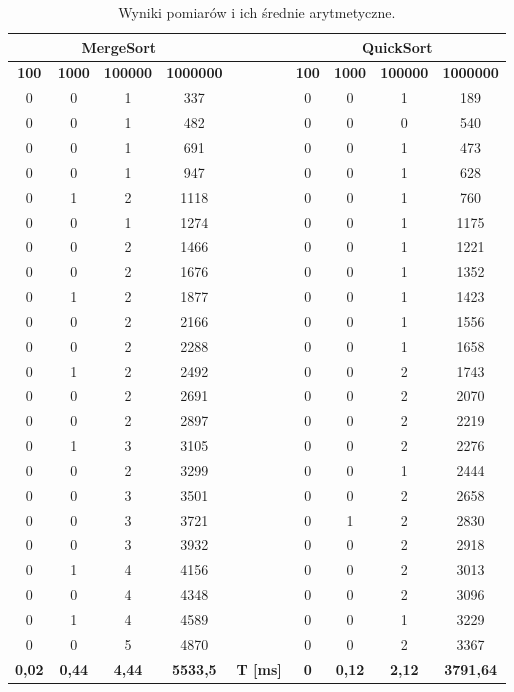 \documentclass[11pt,a4paper]{article}
\begin{document}
\begin{table}[htbp]
\caption{Wyniki pomiarów i ich średnie arytmetyczne.}
\begin{center}
\begin{tabular}{|c|c|c|c|c|c|c|c|c|}
\hline
\multicolumn{ 4}{|c|}{\textbf{MergeSort}} & \textbf{} & \multicolumn{ 4}{c|}{\textbf{QuickSort}} \\ \hline
\textbf{100} & \textbf{1000} & \textbf{100000} & \textbf{1000000} & \textbf{} & \textbf{100} & \textbf{1000} & \textbf{100000} & \textbf{1000000} \\ \hline
0 & 0 & 1 & 337 &  & 0 & 0 & 1 & 189 \\ \hline
0 & 0 & 1 & 482 &  & 0 & 0 & 0 & 540 \\ \hline
0 & 0 & 1 & 691 &  & 0 & 0 & 1 & 473 \\ \hline
0 & 0 & 1 & 947 &  & 0 & 0 & 1 & 628 \\ \hline
0 & 1 & 2 & 1118 &  & 0 & 0 & 1 & 760 \\ \hline
0 & 0 & 1 & 1274 &  & 0 & 0 & 1 & 1175 \\ \hline
0 & 0 & 2 & 1466 &  & 0 & 0 & 1 & 1221 \\ \hline
0 & 0 & 2 & 1676 &  & 0 & 0 & 1 & 1352 \\ \hline
0 & 1 & 2 & 1877 &  & 0 & 0 & 1 & 1423 \\ \hline
0 & 0 & 2 & 2166 &  & 0 & 0 & 1 & 1556 \\ \hline
0 & 0 & 2 & 2288 &  & 0 & 0 & 1 & 1658 \\ \hline
0 & 1 & 2 & 2492 &  & 0 & 0 & 2 & 1743 \\ \hline
0 & 0 & 2 & 2691 &  & 0 & 0 & 2 & 2070 \\ \hline
0 & 0 & 2 & 2897 &  & 0 & 0 & 2 & 2219 \\ \hline
0 & 1 & 3 & 3105 &  & 0 & 0 & 2 & 2276 \\ \hline
0 & 0 & 2 & 3299 &  & 0 & 0 & 1 & 2444 \\ \hline
0 & 0 & 3 & 3501 &  & 0 & 0 & 2 & 2658 \\ \hline
0 & 0 & 3 & 3721 &  & 0 & 1 & 2 & 2830 \\ \hline
0 & 0 & 3 & 3932 &  & 0 & 0 & 2 & 2918 \\ \hline
0 & 1 & 4 & 4156 &  & 0 & 0 & 2 & 3013 \\ \hline
0 & 0 & 4 & 4348 &  & 0 & 0 & 2 & 3096 \\ \hline
0 & 1 & 4 & 4589 &  & 0 & 0 & 1 & 3229 \\ \hline
0 & 0 & 5 & 4870 &  & 0 & 0 & 2 & 3367 \\ \hline
\textbf{0,02} & \textbf{0,44} & \textbf{4,44} & \textbf{5533,5} & \textbf{T [ms]} & \textbf{0} & \textbf{0,12} & \textbf{2,12} & \textbf{3791,64} \\ \hline
\end{tabular}
\end{center}
\label{Wyniki1}
\end{table}
\end{document}
